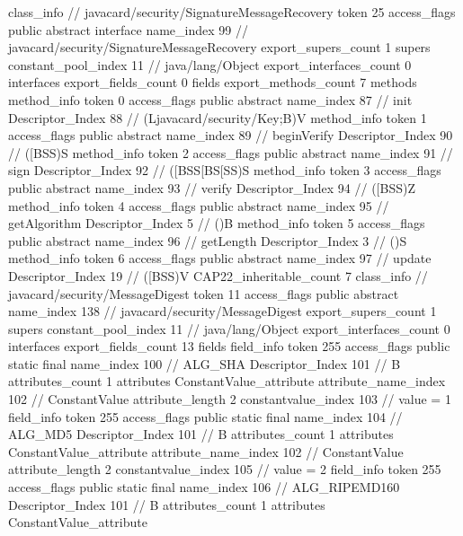 {{{		}
		class_info {		// javacard/security/SignatureMessageRecovery
			token	25
			access_flags	public abstract interface
			name_index	99		// javacard/security/SignatureMessageRecovery
			export_supers_count	1
			supers {
				constant_pool_index	11		// java/lang/Object
			}
			export_interfaces_count	0
			interfaces {
			}
			export_fields_count	0
			fields {
			}
			export_methods_count	7
			methods {
				method_info {
					token	0
					access_flags	public abstract
					name_index	87		// init
					Descriptor_Index	88		// (Ljavacard/security/Key;B)V
				}
				method_info {
					token	1
					access_flags	public abstract
					name_index	89		// beginVerify
					Descriptor_Index	90		// ([BSS)S
				}
				method_info {
					token	2
					access_flags	public abstract
					name_index	91		// sign
					Descriptor_Index	92		// ([BSS[BS[SS)S
				}
				method_info {
					token	3
					access_flags	public abstract
					name_index	93		// verify
					Descriptor_Index	94		// ([BSS)Z
				}
				method_info {
					token	4
					access_flags	public abstract
					name_index	95		// getAlgorithm
					Descriptor_Index	5		// ()B
				}
				method_info {
					token	5
					access_flags	public abstract
					name_index	96		// getLength
					Descriptor_Index	3		// ()S
				}
				method_info {
					token	6
					access_flags	public abstract
					name_index	97		// update
					Descriptor_Index	19		// ([BSS)V
				}
			}
			CAP22_inheritable_count	7
		}
		class_info {		// javacard/security/MessageDigest
			token	11
			access_flags	public abstract
			name_index	138		// javacard/security/MessageDigest
			export_supers_count	1
			supers {
				constant_pool_index	11		// java/lang/Object
			}
			export_interfaces_count	0
			interfaces {
			}
			export_fields_count	13
			fields {
			field_info {
				token	255
				access_flags	public static final
				name_index	100		// ALG_SHA
				Descriptor_Index	101		// B
				attributes_count	1
				attributes {
				ConstantValue_attribute {
					attribute_name_index	102		// ConstantValue
					attribute_length	2
					constantvalue_index	103		// value = 1
				}
				}
			}
			field_info {
				token	255
				access_flags	public static final
				name_index	104		// ALG_MD5
				Descriptor_Index	101		// B
				attributes_count	1
				attributes {
				ConstantValue_attribute {
					attribute_name_index	102		// ConstantValue
					attribute_length	2
					constantvalue_index	105		// value = 2
				}
				}
			}
			field_info {
				token	255
				access_flags	public static final
				name_index	106		// ALG_RIPEMD160
				Descriptor_Index	101		// B
				attributes_count	1
				attributes {
				ConstantValue_attribute {
}}}}}}}
